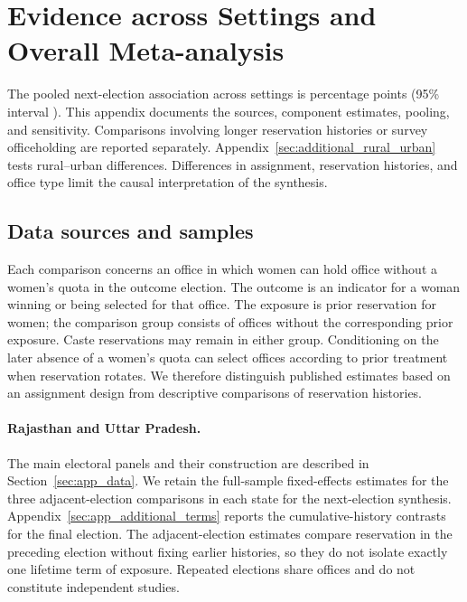 \clearpage
\section{Evidence across Settings and Overall Meta-analysis}\label{sec:additional_evidence}
\suppressfloats[t]

The pooled next-election association across \appMetaSettings{} settings is \appMetaEstimate{} percentage points (95\% interval \appMetaInterval{}). This appendix documents the sources, component estimates, pooling, and sensitivity. Comparisons involving longer reservation histories or survey officeholding are reported separately. Appendix~\ref{sec:additional_rural_urban} tests rural--urban differences. Differences in assignment, reservation histories, and office type limit the causal interpretation of the synthesis.

\subsection{Data sources and samples}\label{sec:additional_data}

Each comparison concerns an office in which women can hold office without a women's quota in the outcome election. The outcome is an indicator for a woman winning or being selected for that office. The exposure is prior reservation for women; the comparison group consists of offices without the corresponding prior exposure. Caste reservations may remain in either group. Conditioning on the later absence of a women's quota can select offices according to prior treatment when reservation rotates. We therefore distinguish published estimates based on an assignment design from descriptive comparisons of reservation histories.

\paragraph{Rajasthan and Uttar Pradesh.} The main electoral panels and their construction are described in Section~\ref{sec:app_data}. We retain the full-sample fixed-effects estimates for the three adjacent-election comparisons in each state for the next-election synthesis. Appendix~\ref{sec:app_additional_terms} reports the cumulative-history contrasts for the final election. The adjacent-election estimates compare reservation in the preceding election without fixing earlier histories, so they do not isolate exactly one lifetime term of exposure. Repeated elections share offices and do not constitute independent studies.

